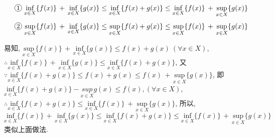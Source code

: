 \begin{enumerate}
	$$\circled{1}
	\underset{x\in X}{\mathrm{inf}}\{f(x)\}\,+\,\underset{x\in X}{\mathrm{inf}}\{g(x)\} \le
	\underset{x\in X}{\mathrm{inf}}\{f(x)+g(x)\} \le 	\underset{x\in X}{\mathrm{inf}}\{f(x)\}\,+\,\underset{x\in X}{\mathrm{sup}}\{g(x)\}
	$$ 
	$$\circled{2}
		\underset{x\in X}{\mathrm{sup}}\{f(x)\}\,+\,\underset{x\in X}{\mathrm{inf}}\{g(x)\} \le 	\underset{x\in X}{\mathrm{sup}}\{f(x)+g(x)\} \le \underset{x\in X}{\mathrm{sup}}\{f(x)\}\,+\,	\underset{x\in X}{\mathrm{sup}}\{g(x)\}
	$$
	\begin{solution}
		\textcolor{green}{} 易知, $\underset{x\in X}{\mathrm{sup}}\{f(x)\}\,+\,\underset{x\in X}{\mathrm{inf}}\{g(x)\}\le f(x)+g(x)\ (\forall x \in X)$, $\therefore \underset{x\in X}{\mathrm{inf}}\{f(x)\}\,+\,\underset{x\in X}{\mathrm{inf}}\{g(x)\} \le
		\underset{x\in X}{\mathrm{inf}}\{f(x)+g(x)\}$, 又$\because \underset{x\in X}{\mathrm{inf}}\{f(x)+g(x)\} \le f(x)+g(x) \le f(x)\,+\,\underset{x\in X}{\mathrm{sup}}\{g(x)\} $, 即$\underset{x\in X}{\mathrm{inf}}\{f(x)+g(x)\} - \underset{x\in X}{sup}g(x)\le f(x), (\forall x \in X)$, $\therefore \underset{x\in X}{\mathrm{inf}}\{f(x)+g(x)\} \le 	\underset{x\in X}{\mathrm{inf}}\{f(x)\}\,+\,\underset{x\in X}{\mathrm{sup}}\{g(x)\}$, 所以,
		$
		\underset{x\in X}{\mathrm{inf}}\{f(x)\}\,+\,\underset{x\in X}{\mathrm{inf}}\{g(x)\} \le
		\underset{x\in X}{\mathrm{inf}}\{f(x)+g(x)\} \le 	\underset{x\in X}{\mathrm{inf}}\{f(x)\}\,+\,\underset{x\in X}{\mathrm{sup}}\{g(x)\}
		$
		\textcolor{green}{} 类似上面做法.

		
	\end{solution}
\end{enumerate}
